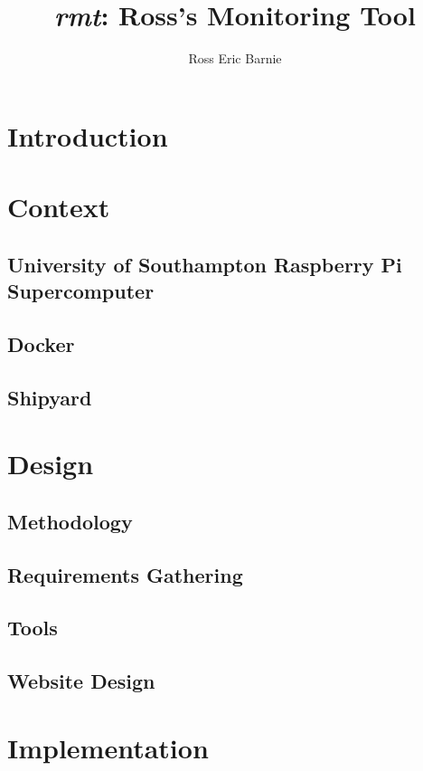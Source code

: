 \documentclass{l4proj}
\title{\emph{rmt}: Ross's Monitoring Tool}
\author{Ross Eric Barnie}
\begin{document}
\maketitle
\tableofcontents
\listoffigures



\chapter{Introduction}


\chapter{Context}
\section{University of Southampton Raspberry Pi Supercomputer}

\section{Docker}

\section{Shipyard}


\chapter{Design}
\section{Methodology}

\section{Requirements Gathering}

\section{Tools}

\section{Website Design}


\chapter{Implementation}
\end{document}
